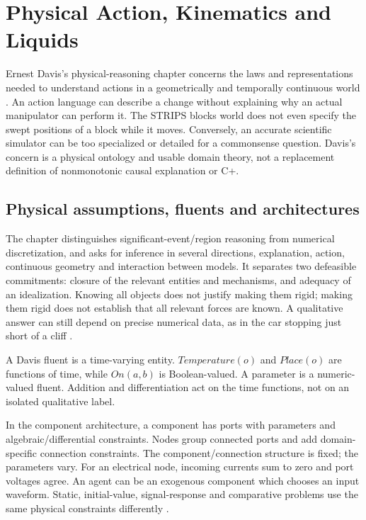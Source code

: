 \chapter{Physical Action, Kinematics and Liquids}
\label{sec:p16-kr2008-action-and-causation}

Ernest Davis's physical-reasoning chapter concerns the laws and representations
needed to understand actions in a geometrically and temporally continuous
world \cite[pp.~597--620]{Davis2008PhysicalReasoning}.
An action language can describe a change without explaining why an actual
manipulator can perform it. The STRIPS blocks world does not even specify
the swept positions of a block while it moves. Conversely, an accurate
scientific simulator can be too specialized or detailed for a commonsense
question. Davis's concern is a physical ontology and usable domain theory,
not a replacement definition of nonmonotonic causal explanation or C+.

\section{Physical assumptions, fluents and architectures}
\label{sec:p16-phys-architectures}

The chapter distinguishes significant-event/region reasoning from numerical
discretization, and asks for inference in several directions, explanation,
action, continuous geometry and interaction between models. It separates
two defeasible commitments: closure of the relevant entities and mechanisms,
and adequacy of an idealization. Knowing all objects does not justify making
them rigid; making them rigid does not establish that all relevant forces
are known. A qualitative answer can still depend on precise numerical data,
as in the car stopping just short of a cliff
\cite[pp.~597--600]{Davis2008PhysicalReasoning}.

A Davis fluent is a time-varying entity. \(Temperature(o)\) and
\(Place(o)\) are functions of time, while \(On(a,b)\) is Boolean-valued.
A parameter is a numeric-valued fluent. Addition and differentiation act on
the time functions, not on an isolated qualitative label.

In the component architecture, a component has ports with parameters and
algebraic/differential constraints. Nodes group connected ports and add
domain-specific connection constraints. The component/connection structure
is fixed; the parameters vary. For an electrical node, incoming currents
sum to zero and port voltages agree. An agent can be an exogenous component
which chooses an input waveform. Static, initial-value, signal-response and
comparative problems use the same physical constraints differently
\cite[pp.~600--601]{Davis2008PhysicalReasoning}.

